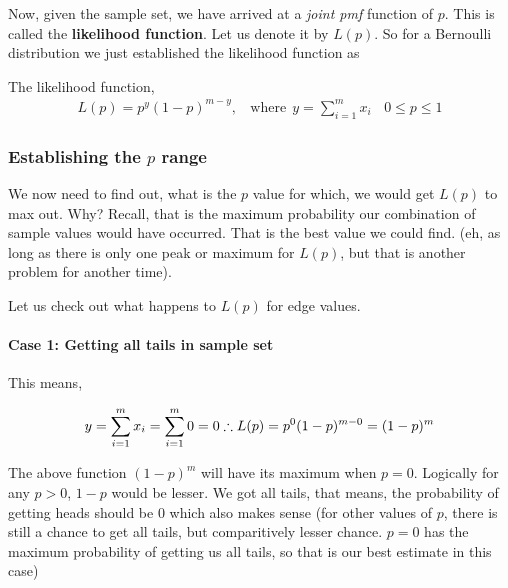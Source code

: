 \documentclass[float=false,crop=false]{standalone}
\begin{document}
Now, given the sample set, we have arrived at a \emph{joint pmf}
function of \(p\). This is called the \textbf{likelihood function}. Let
us denote it by \(L(p)\). So for a Bernoulli distribution we just
established the likelihood function as
\begin{tcolorbox}[colback=green!5,colframe=green!40!black,title=Bernoulli Distribution; $m$ trials]
The likelihood function,
\begin{equation}
\begin{aligned}
    L(p) = p^{y}(1 - p)^{m - y}, \ \ \ \ \text{where} \ \  y = \sum\limits_{i=1}^{m}x_i \ \ \ \ 0 \leq p \leq 1 \label{eq:M002}
\end{aligned}
\end{equation}
\end{tcolorbox}
    \subsubsection{\texorpdfstring{Establishing the \(p\)
range}{Establishing the p range}}\label{establishing-the-p-range}

We now need to find out, what is the \(p\) value for which, we would get
\(L(p)\) to max out. Why? Recall, that is the maximum probability our
combination of sample values would have occurred. That is the best value
we could find. (eh, as long as there is only one peak or maximum for
\(L(p)\), but that is another problem for another time).

Let us check out what happens to \(L(p)\) for edge values.

\paragraph{Case 1: Getting all tails in sample
set}\label{case-1-getting-all-tails-in-sample-set}

This means,

\[
y = \sum\limits_{i=1}^{m}x_i = \sum\limits_{i=1}^{m}0 = 0 \\
\therefore L(p) = p^0(1-p)^{m-0} = (1-p)^m
\]

The above function \((1-p)^m\) will have its maximum when \(p=0\).
Logically for any \(p>0\), \(1-p\) would be lesser. We got all tails,
that means, the probability of getting heads should be 0 which also
makes sense (for other values of \(p\), there is still a chance to get
all tails, but comparitively lesser chance. \(p=0\) has the maximum
probability of getting us all tails, so that is our best estimate in
this case)
\end{document}
